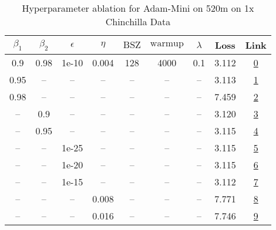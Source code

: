 \begin{table}[H]
\centering
\caption{Hyperparameter ablation for Adam-Mini on 520m on 1x Chinchilla Data}
\label{tab:ablation_adam-mini_520m_1}
\begin{tabular}{ccccccccc}
\toprule
$\beta_1$ & $\beta_2$ & $\epsilon$ & $\eta$ & $\mathrm{BSZ}$ & $\mathrm{warmup}$ & $\lambda$ & Loss & Link \\
\midrule
0.9 & 0.98 & 1e-10 & 0.004 & 128 & 4000 & 0.1 & 3.112 & \href{https://wandb.ai/stanford-mercury/optimizer-scaling/runs/sweep-520m-10B-mini9187d7lr0.004-wd0.1-minlr0-warmup4000-b10.9-b-398e5f}{0} \\
\midrule
0.95 & -- & -- & -- & -- & -- & -- & 3.113 & \href{https://wandb.ai/stanford-mercury/optimizer-scaling/runs/sweep-520m-10B-minic83515lr0.004-wd0.1-minlr0-warmup4000-b10.95--2b99be}{1} \\
0.98 & -- & -- & -- & -- & -- & -- & 7.459 & \href{https://wandb.ai/stanford-mercury/optimizer-scaling/runs/sweep-520m-10B-mini61f7e6lr0.004-wd0.1-minlr0-warmup4000-b10.98--c8aa3c}{2} \\
-- & 0.9 & -- & -- & -- & -- & -- & 3.120 & \href{https://wandb.ai/stanford-mercury/optimizer-scaling/runs/sweep-520m-10B-minib059b0lr0.004-wd0.1-minlr0-warmup4000-b10.9-b-ef048a}{3} \\
-- & 0.95 & -- & -- & -- & -- & -- & 3.115 & \href{https://wandb.ai/stanford-mercury/optimizer-scaling/runs/sweep-520m-10B-minid80005lr0.004-wd0.1-minlr0-warmup4000-b10.9-b-4d59a5}{4} \\
-- & -- & 1e-25 & -- & -- & -- & -- & 3.115 & \href{https://wandb.ai/stanford-mercury/optimizer-scaling/runs/sweep-520m-10B-mini030aa2lr0.004-wd0.1-minlr0-warmup4000-b10.9-b-e031a9}{5} \\
-- & -- & 1e-20 & -- & -- & -- & -- & 3.115 & \href{https://wandb.ai/stanford-mercury/optimizer-scaling/runs/sweep-520m-10B-miniad4882lr0.004-wd0.1-minlr0-warmup4000-b10.9-b-375106}{6} \\
-- & -- & 1e-15 & -- & -- & -- & -- & 3.112 & \href{https://wandb.ai/stanford-mercury/optimizer-scaling/runs/sweep-520m-10B-minica5e495lr0.004-wd0.1-minlr0-warmup4000-b10.9--791457}{7} \\
-- & -- & -- & 0.008 & -- & -- & -- & 7.771 & \href{https://wandb.ai/stanford-mercury/optimizer-scaling/runs/sweep-520m-10B-mini8213c6lr0.008-wd0.1-minlr0-warmup4000-b10.9-b-cea98b}{8} \\
-- & -- & -- & 0.016 & -- & -- & -- & 7.746 & \href{https://wandb.ai/stanford-mercury/optimizer-scaling/runs/sweep-520m-10B-mini743375lr0.016-wd0.1-minlr0-warmup4000-b10.9-b-71d93a}{9} \\

\end{tabular}
\end{table}
